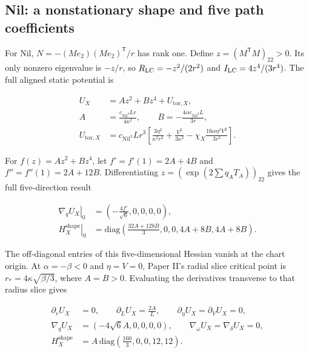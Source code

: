 \subsection{Nil: a nonstationary shape and five path coefficients}

For Nil, $N=-(Me_2)(Me_2)^{\mathsf T}/r$ has rank one. Define $z=(M^{\mathsf T}M)_{22}>0$. Its only nonzero eigenvalue is $-z/r$, so $R_{\rm LC}=-z^2/(2r^2)$ and $I_{\rm LC}=4z^4/(3r^4)$. The full aligned static potential is

\begin{equation}\tag{H-03}\label{eq:H-03}
\begin{aligned}
U_X&=Az^2+Bz^4+U_{\mathrm{tor},X},\\
A&=\frac{c_{\mathrm{Nil}^3}Lr}{4\kappa^2},\qquad
B=-\frac{4\alpha c_{\mathrm{Nil}^3}L}{3r},\\
U_{\mathrm{tor},X}&=c_{\mathrm{Nil}^3}Lr^3
\left[\frac{3\eta^2}{\kappa^2r^2}+\frac{V^2}{3\kappa^2}
-\chi_X\frac{16\alpha\eta^2V^2}{3r^2}\right].
\end{aligned}
\end{equation}

For $f(z)=Az^2+Bz^4$, let $f'=f'(1)=2A+4B$ and $f''=f''(1)=2A+12B$. Differentiating $z=(\exp(2\sum q_AT_A))_{22}$ gives the full five-direction result

\begin{equation}\tag{H-04}\label{eq:H-04}
\begin{aligned}
\left.\nabla_qU_X\right|_0
&=\left(-\frac{4f'}{\sqrt6},0,0,0,0\right),\\
\left.H^{\mathrm{shape}}_X\right|_0
&=\mathrm{diag}\left(\frac{32A+128B}{3},0,0,4A+8B,4A+8B\right).
\end{aligned}
\end{equation}

The off-diagonal entries of this five-dimensional Hessian vanish at the chart origin. At $\alpha=-\beta<0$ and $\eta=V=0$, Paper II's radial slice critical point is $r_*=4\kappa\sqrt{\beta/3}$, where $A=B>0$. Evaluating the derivatives transverse to that radius slice gives

\begin{equation}\tag{H-05}\label{eq:H-05}
\begin{aligned}
\partial_rU_X&=0,\qquad \partial_LU_X=\frac{2A}{L},\qquad
\partial_\eta U_X=\partial_VU_X=0,\\
\nabla_qU_X&=(-4\sqrt6 A,0,0,0,0),\qquad
\nabla_\omega U_X=\nabla_\delta U_X=0,\\
H^{\mathrm{shape}}_X&=A\,\mathrm{diag}\left(\frac{160}{3},0,0,12,12\right).
\end{aligned}
\end{equation}

